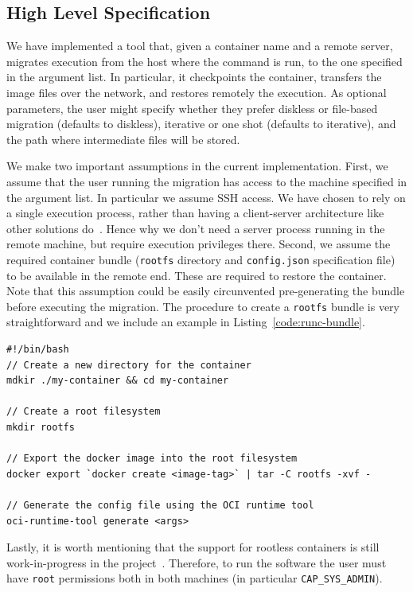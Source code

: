 \subsection{High Level Specification}

We have implemented a tool that, given a container name and a remote server, migrates execution from the host where the command is run, to the one specified in the argument list.
In particular, it checkpoints the container, transfers the image files over the network, and restores remotely the execution.
As optional parameters, the user might specify whether they prefer diskless or file-based migration (defaults to diskless), iterative or one shot (defaults to iterative), and the path where intermediate files will be stored.

We make two important assumptions in the current implementation.
First, we assume that the user running the migration has access to the machine specified in the argument list.
In particular we assume SSH access.
We have chosen to rely on a single execution process, rather than having a client-server architecture like other solutions do~\cite{criu-phaul}.
Hence why we don't need a server process running in the remote machine, but require execution privileges there.
Second, we assume the required container bundle (\texttt{rootfs} directory and \texttt{config.json} specification file) to be available in the remote end.
These are required to restore the container.
Note that this assumption could be easily circunvented pre-generating the bundle before executing the migration.
The procedure to create a \texttt{rootfs} bundle is very straightforward and we include an example in Listing~\ref{code:runc-bundle}.
\begin{lstlisting}[style=Bash,caption={Commands to generate an OCI bundle to run a container using \runc.\label{code:runc-bundle}}]
#!/bin/bash
// Create a new directory for the container
mdkir ./my-container && cd my-container

// Create a root filesystem
mkdir rootfs

// Export the docker image into the root filesystem
docker export `docker create <image-tag>` | tar -C rootfs -xvf -

// Generate the config file using the OCI runtime tool
oci-runtime-tool generate <args>
\end{lstlisting}
Lastly, it is worth mentioning that the support for rootless containers is still work-in-progress in the \criu project~\cite{criu-user-mode}.
Therefore, to run the software the user must have \texttt{root} permissions both in both machines (in particular \texttt{CAP\_SYS\_ADMIN}).

